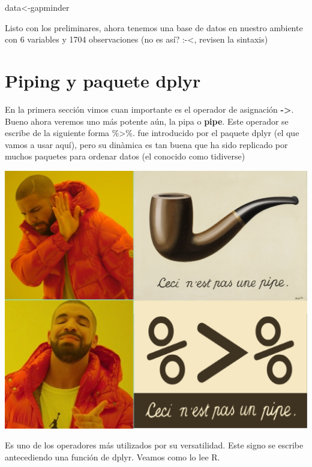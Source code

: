 \documentclass[
]{book}
\newenvironment{Shaded}{\begin{snugshade}}{\end{snugshade}}
\newcommand{\NormalTok}[1]{#1}
\newcommand{\OtherTok}[1]{\textcolor[rgb]{0.56,0.35,0.01}{#1}}
\begin{document}
\begin{Shaded}
\begin{Highlighting}[]
\NormalTok{data}\OtherTok{\textless{}{-}}\NormalTok{gapminder}
\end{Highlighting}
\end{Shaded}

Listo con los preliminares, ahora tenemos una base de datos en nuestro ambiente con 6 variables y 1704 observaciones (no es así? :-\textless, revisen la sintaxis)

\hypertarget{piping-y-paquete-dplyr}{%
\section{Piping y paquete dplyr}\label{piping-y-paquete-dplyr}}

En la primera sección vimos cuan importante es el operador de asignación \textbf{-\textgreater{}}. Bueno ahora veremos uno más potente aún, la pipa o \textbf{pipe}. Este operador se escribe de la siguiente forma \%\textgreater\%. fue introducido por el paquete dplyr (el que vamos a usar aquí), pero su dinàmica es tan buena que ha sido replicado por muchos paquetes para ordenar datos (el conocido como tidiverse)

\includegraphics[width=90.4in]{img/memedrake}

Es uno de los operadores más utilizados por su versatilidad. Este signo se escribe antecediendo una función de dplyr. Veamos como lo lee R.
\end{document}

